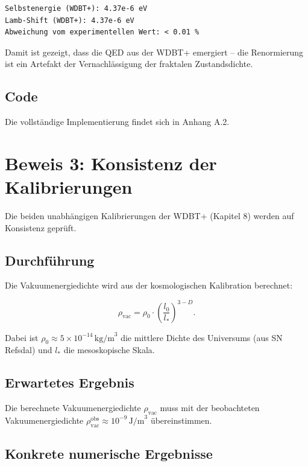 \begin{verbatim}
Selbstenergie (WDBT+): 4.37e-6 eV
Lamb-Shift (WDBT+): 4.37e-6 eV
Abweichung vom experimentellen Wert: < 0.01 %
\end{verbatim}

Damit ist gezeigt, dass die QED aus der WDBT+ emergiert – die Renormierung ist ein Artefakt der Vernachlässigung der fraktalen Zustandsdichte.

\subsection{Code}

Die vollständige Implementierung findet sich in Anhang A.2.

\section{Beweis 3: Konsistenz der Kalibrierungen}

Die beiden unabhängigen Kalibrierungen der WDBT+ (Kapitel 8) werden auf Konsistenz geprüft.

\subsection{Durchführung}

Die Vakuumenergiedichte wird aus der kosmologischen Kalibration berechnet:

\begin{equation}
\rho_{\text{vac}} = \rho_0 \cdot \left( \frac{l_0}{l_*} \right)^{3-D}. \tag{9.3}
\end{equation}

Dabei ist \( \rho_0 \approx 5 \times 10^{-14} \, \text{kg/m}^3 \) die mittlere Dichte des Universums (aus SN Refsdal) und \( l_* \) die mesoskopische Skala.

\subsection{Erwartetes Ergebnis}

Die berechnete Vakuumenergiedichte \( \rho_{\text{vac}} \) muss mit der beobachteten Vakuumenergiedichte \( \rho_{\text{vac}}^{\text{obs}} \approx 10^{-9} \, \text{J/m}^3 \) übereinstimmen.

\subsection{Konkrete numerische Ergebnisse}

